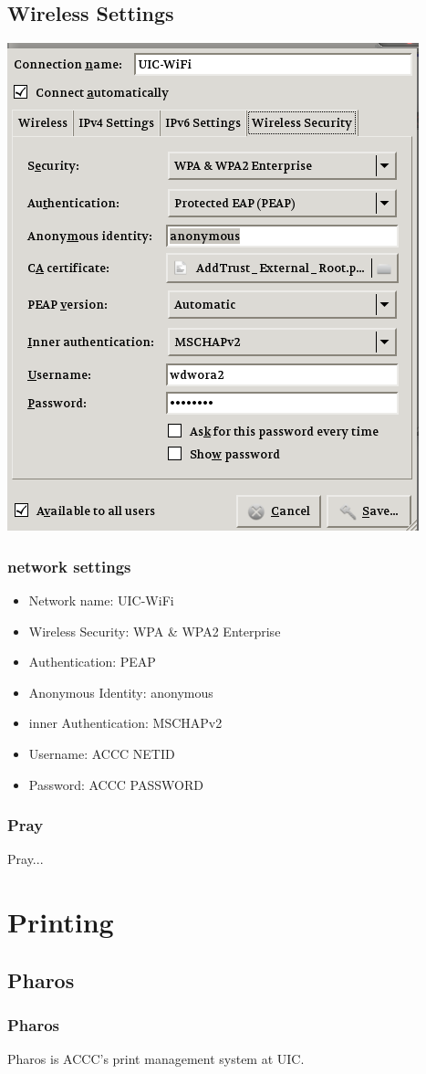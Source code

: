 \documentclass[hyperref={pdfpagelabels=false}]{beamer}
\begin{document}
\subsection{Wireless Settings}
\frame
{
     \includegraphics[totalheight=0.8\textheight]{uicwificonfig.png}
}
\frame
{
    \frametitle{network settings}
    \begin{itemize}
    \item{Network name: UIC-WiFi}
    \item{Wireless Security: WPA & WPA2 Enterprise}
    \item{Authentication: PEAP}
    \item{Anonymous Identity: anonymous}
    \item{inner Authentication: MSCHAPv2}
    \item{Username: ACCC NETID}
    \item{Password: ACCC PASSWORD}
    \end{itemize}
}
\frame
{
    \frametitle{Pray}
    Pray...
}
\section{Printing}
\subsection{Pharos}
\frame
{
    \frametitle{Pharos}
    Pharos is ACCC's print management system at UIC.
}
\end{document}

